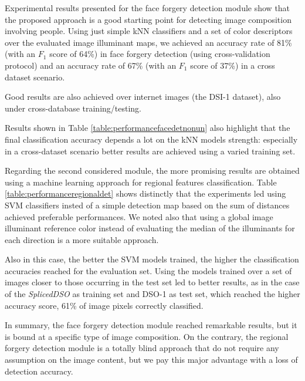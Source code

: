 Experimental results presented for the face forgery detection module show that the proposed approach is a good starting point for detecting image composition involving people. Using just simple kNN classifiers and a set of color descriptors over the evaluated image illuminant maps, we achieved an accuracy rate of 81\%  (with an $F_1$ score of 64\%) in face forgery detection (using cross-validation protocol) and an accuracy rate of 67\% (with an $F_1$ score of 37\%) in a cross dataset scenario.

Good results are also achieved over internet images (the DSI-1 dataset), also under cross-database training/testing.

Results shown in Table \ref{table:performancefacedetnonun} also highlight that the final classification accuracy depends a lot on the kNN models strength: especially in a cross-dataset scenario better results are achieved using a varied training set. 

Regarding the second considered module, the more promising results are obtained using a machine learning approach for regional features classification. Table \ref{table:performanceregionaldet} shows distinctly that the experiments led using SVM classifiers insted of a simple detection map based on the sum of distances achieved preferable performances. We noted also that using a global image illuminant reference color instead of evaluating the median of the illuminants for each direction is a more suitable approach.

Also in this case, the better the SVM models trained, the higher the classification accuracies reached for the evaluation set. Using the models trained over a set of images closer to those occurring in the test set led to better results, as in the case of the \emph{SplicedDSO} as training set and DSO-1 as test set, which reached the higher accuracy score, 61\% of image pixels correctly classified.

In summary, the face forgery detection module reached remarkable results, but it is bound at a specific type of image composition. On the contrary, the regional forgery detection module is a totally blind approach that do not require any assumption on the image content, but we pay this major advantage with a loss of detection accuracy.